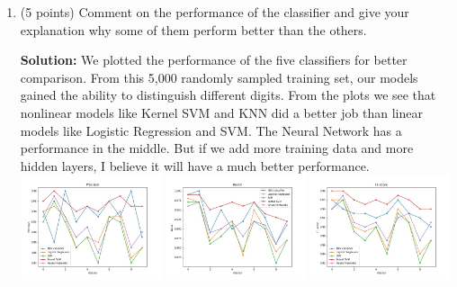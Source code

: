\documentclass[twoside,10pt]{article}
\begin{document}
\begin{enumerate}
\begin{enumerate}
\begin{tcolorbox}

\end{tcolorbox}
\newpage
	\item (5 points) Comment on the performance of the classifier and give your explanation why some of them perform better than the others.	%
\begin{tcolorbox}
\textbf{Solution:}
We plotted the performance of the five classifiers for better comparison. From this 5,000 randomly sampled training set, our models gained the ability to distinguish different digits. From the plots we see that nonlinear models like Kernel SVM and KNN did a better job than linear models like Logistic Regression and SVM. The Neural Network has a performance in the middle. But if we add more training data and more hidden layers, I believe it will have a much better performance. \\
\includegraphics[width=0.325\textwidth]{images/Precision.jpg}
\includegraphics[width=0.325\textwidth]{images/Recall.jpg}
\includegraphics[width=0.325\textwidth]{images/F1-score.jpg}


\end{tcolorbox}
\end{enumerate}
\end{enumerate}
\end{document}

